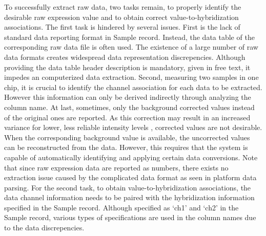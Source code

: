 To successfully extract raw data, two tasks remain, to properly identify the
desirable raw expression value and to obtain correct value-to-hybridization
associations.
%
The first task is hindered by several issues. First is the lack of standard
data reporting format in Sample record.
%
Instead, the data table of the corresponding raw data file is often used.
%
The existence of a large number of raw data formats creates widespread data
representation discrepencies.
%
Although providing the data table header description is mandatory, given in
free text, it impedes an computerized data extraction.
%
Second, measuring two samples in one chip, it is crucial to identify the
channel association for each data to be extracted.  However this information
can only be derived indirectly through analyzing the column name.
%
At last, sometimes, only the background corrected values instead of the
original ones are reported.  As this correction may result in an increased
variance for lower, less reliable intensity levels \cite{Ritchie ME,
  Bioinformatics, 2007;23:2700-2707}, corrected values are not desirable.
%
When the corresponding background value is available, the uncorrected values
can be reconstructed from the data.  However, this requires that the system is
capable of automatically identifying and applying certain data conversions.
%
Note that since raw expression data are reported as numbers, there exists no
extraction issue caused by the complicated data format as seen in platform data
parsing.
%
For the second task, to obtain value-to-hybridization associations, the data
channel information needs to be paired with the hybridization information
specified in the Sample record.
%
Although specified as `ch1' and `ch2' in the Sample record, various types of 
specifications are used in the column names due to the data discrepencies. 


